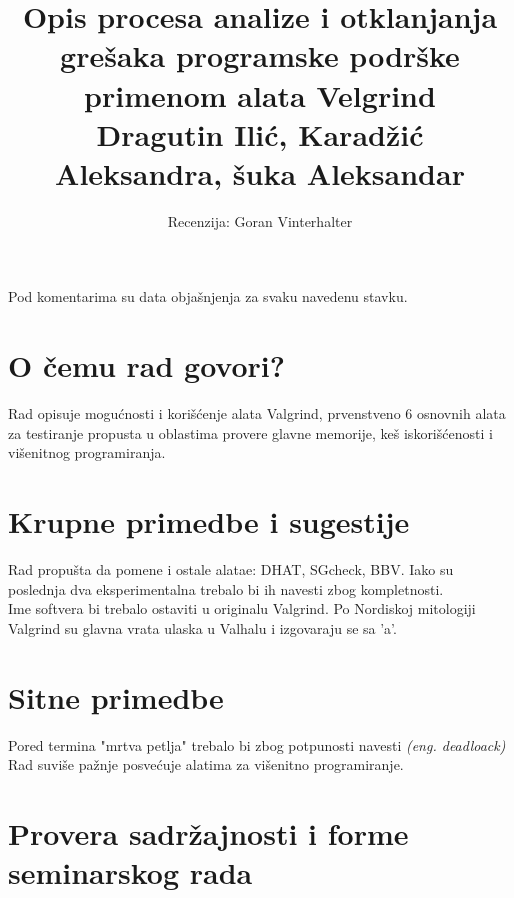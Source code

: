 \documentclass[a4paper]{article}
\begin{document}
\title{
  Opis procesa analize i otklanjanja grešaka
  programske podrške primenom alata Velgrind
\\ \small{Dragutin Ilić, Karadžić Aleksandra, šuka Aleksandar }
}

\author{Recenzija: Goran Vinterhalter}


\maketitle


Pod komentarima su data objašnjenja za svaku navedenu stavku.

\section{O čemu rad govori?}
Rad opisuje mogućnosti i korišćenje alata Valgrind, prvenstveno 6 osnovnih alata za
testiranje propusta u oblastima provere glavne memorije, keš iskorišćenosti
i višenitnog programiranja.

\section{Krupne primedbe i sugestije}
Rad propušta da pomene i ostale alatae: DHAT, SGcheck, BBV. Iako su poslednja
dva eksperimentalna trebalo bi ih navesti zbog kompletnosti.\\
Ime softvera bi trebalo ostaviti u originalu Valgrind. Po Nordiskoj mitologiji
Valgrind su glavna vrata ulaska u Valhalu i izgovaraju se sa 'a'.

\section{Sitne primedbe}
Pored termina "mrtva petlja" trebalo bi zbog potpunosti navesti \textit{(eng. deadloack)}
Rad suviše pažnje posvećuje alatima za višenitno programiranje.

\section{Provera sadržajnosti i forme seminarskog rada}
\end{document}
